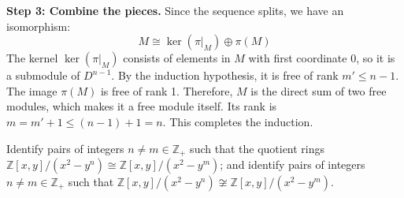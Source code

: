 \begin{solution}
\textbf{Step 3: Combine the pieces.}
Since the sequence splits, we have an isomorphism:
\[ M \cong \ker(\pi|_M) \oplus \pi(M) \]
The kernel $\ker(\pi|_M)$ consists of elements in $M$ with first coordinate 0, so it is a submodule of $D^{n-1}$. By the induction hypothesis, it is free of rank $m' \leq n-1$.
The image $\pi(M)$ is free of rank 1.
Therefore, $M$ is the direct sum of two free modules, which makes it a free module itself. Its rank is $m = m' + 1 \leq (n-1) + 1 = n$.
This completes the induction.
\end{solution}

\begin{exercise}
\label{algebra:2011:9}
Identify pairs of integers $n \neq m \in \mathbb{Z}_+$ such that the quotient rings $\mathbb{Z}[x, y]/(x^2 - y^n) \cong \mathbb{Z}[x, y]/(x^2 - y^m)$; and identify pairs of integers $n \neq m \in \mathbb{Z}_+$ such that $\mathbb{Z}[x, y]/(x^2 - y^n) \not\cong \mathbb{Z}[x, y]/(x^2 - y^m)$.
\end{exercise}

